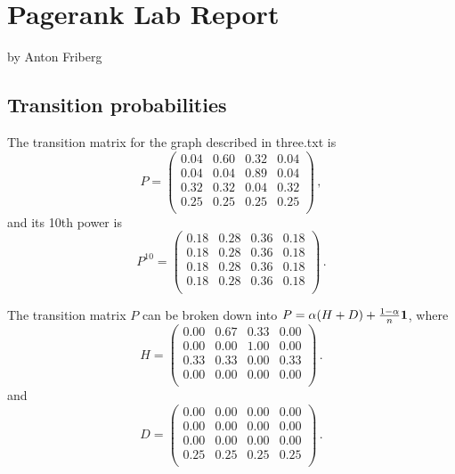\documentclass{tufte-handout}
\begin{document}
\newpage
\section{Pagerank Lab Report}


by Anton Friberg

\subsection{Transition probabilities}

The transition matrix for the graph described in three.txt
is
\begin{equation*}
P = 
\left(
\begin{array}{cccc}
0.04 & 0.60 & 0.32 & 0.04 \\
0.04 & 0.04 & 0.89 & 0.04 \\
0.32 & 0.32 & 0.04 & 0.32 \\
0.25 & 0.25 & 0.25 & 0.25 \\
\end{array}
\right)\,,
\end{equation*}
and its 10th power is
\begin{equation*}
P^{10} = 
\left(
\begin{array}{cccc}
0.18 & 0.28 & 0.36 & 0.18 \\
0.18 & 0.28 & 0.36 & 0.18 \\
0.18 & 0.28 & 0.36 & 0.18 \\
0.18 & 0.28 & 0.36 & 0.18 \\
\end{array}
\right)\,.
\end{equation*}

The transition matrix $P$ can be broken down into  $P = \alpha(H + D)
+ \frac{1-\alpha}{n} \bf 1$, where
\begin{equation*}
H =
\left(
\begin{array}{cccc}
0.00 & 0.67 & 0.33 & 0.00 \\
0.00 & 0.00 & 1.00 & 0.00 \\
0.33 & 0.33 & 0.00 & 0.33 \\
0.00 & 0.00 & 0.00 & 0.00 \\
\end{array}
\right)\,.
\end{equation*}
and \begin{equation*}
D =
\left(
\begin{array}{cccc}
0.00 & 0.00 & 0.00 & 0.00 \\
0.00 & 0.00 & 0.00 & 0.00 \\
0.00 & 0.00 & 0.00 & 0.00 \\
0.25 & 0.25 & 0.25 & 0.25 \\
\end{array}
\right)\,.
\end{equation*}
\end{document}
